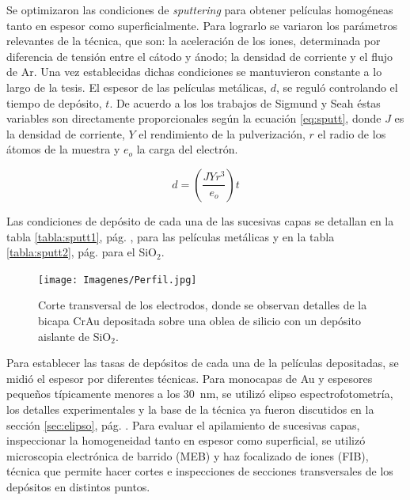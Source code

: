 		 Se optimizaron las condiciones de \textit{sputtering} para obtener películas homogéneas tanto en espesor como superficialmente. Para lograrlo se variaron los parámetros relevantes de la técnica, que son: la aceleración de los iones, determinada por diferencia de tensión entre el cátodo y ánodo; la densidad de corriente y el flujo de Ar. Una vez establecidas dichas condiciones se mantuvieron constante a lo largo de la tesis. El espesor de las películas metálicas, $d$, se reguló controlando el tiempo de depósito, $t$. De acuerdo a los los trabajos de Sigmund\cite{sigmund1968} y Seah\cite{Seah2005} éstas variables son directamente proporcionales según la ecuación \ref{eq:sputt}, donde $J$ es la densidad de corriente, $Y$ el rendimiento de la pulverización, $r$ el radio de los átomos de la muestra y $e_o$ la carga del electrón.

	 			\begin{equation}
	 				d=\left(\frac{JYr^3}{e_o}\right)t
	 				\label{eq:sputt}
	 			\end{equation}

		 Las condiciones de depósito de cada una de las sucesivas capas se detallan en la tabla \ref{tabla:sputt1}, pág. \pageref{tabla:sputt1}, para las películas metálicas y en la tabla  \ref{tabla:sputt2}, pág. \pageref{tabla:sputt2} para el SiO$_2$. 

						  \begin{figure}[ht!]
						  \begin{center}
						  \texttt{[image: Imagenes/Perfil.jpg]}
						  \caption[Sección trasversal de los eletrodos]{Corte transversal de los electrodos, donde se observan detalles de la bicapa Cr\textbar Au depositada sobre una oblea de silicio con un depósito aislante de SiO$_2$.}
						  \label{fig:FIB_electrodos}
						  \end{center}
						  \end{figure} 	

		 Para establecer las tasas de depósitos de cada una de la películas depositadas, se midió el espesor por diferentes técnicas. Para monocapas de Au y espesores pequeños típicamente menores a los \SI{30}{\nm}, se utilizó elipso espectrofotometría, los detalles experimentales y la base de la técnica ya fueron discutidos en la sección \ref{sec:elipso}, pág. \pageref{sec:elipso}. Para evaluar el apilamiento de sucesivas capas, inspeccionar la homogeneidad tanto en espesor como superficial, se utilizó microscopia electrónica de barrido (MEB) y haz focalizado de iones (FIB), técnica que permite hacer cortes e inspecciones de secciones transversales de los depósitos en distintos puntos. 

